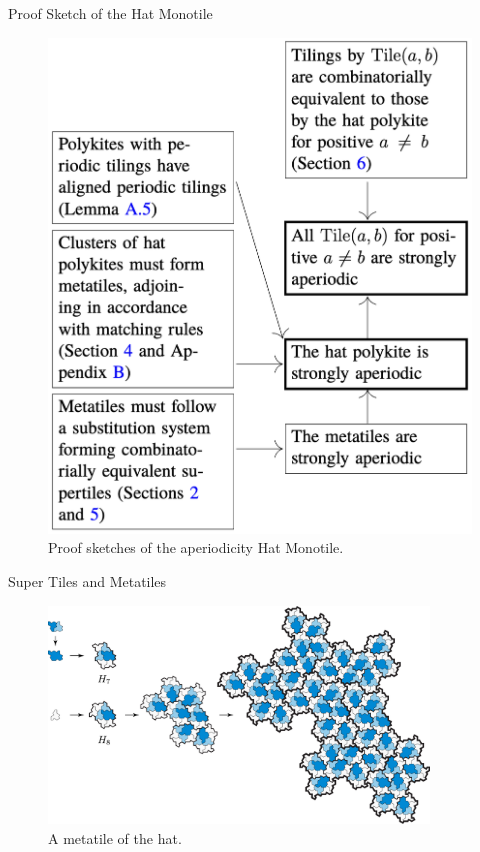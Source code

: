 \documentclass{beamer}
\begin{document}
\begin{frame}{Proof Sketch of the Hat Monotile}
\begin{figure}
\begin{minipage}{0.45\textwidth}
            \includegraphics[width=\linewidth]{images/proof2.png}
        \end{minipage}
        \caption{Proof sketches of the aperiodicity Hat Monotile.\cite{Smith_2024}}
        \label{fig:enter-label}
    \end{figure}
\end{frame}

\begin{frame}{Super Tiles and Metatiles}
    \begin{figure}
        \centering
        \includegraphics[page=1,width=0.9\textwidth]{images/aperiodic-pdfs/alt_subst.pdf}
        \caption{A metatile of the hat. \cite{Smith_2024}}
        \label{fig:hat-metatile}
    \end{figure}
\end{frame}
\end{document}
